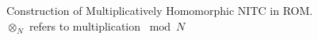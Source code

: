 \begin{figure}[h!]
\begin{center}
\begin{tabular}{|ll|}

\hline          
\end{tabular}
\caption{Construction of Multiplicatively Homomorphic NITC in ROM. \\ $\otimes_N$ refers to multiplication $\bmod N$}
\label{table:nitc-mh-rom}
\end{center}
\end{figure}

